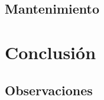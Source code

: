 \documentclass{article}
\begin{document}
	\subsection{Mantenimiento}
	\section{Conclusión}
	\subsection{Observaciones}
\end{document}
